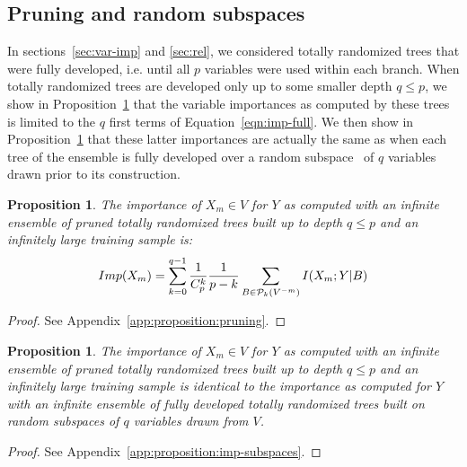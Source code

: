 \documentclass{article}
\newtheorem{proposition}[theorem]{Proposition}
\begin{document}

\subsection{Pruning and random subspaces}

In sections~\ref{sec:var-imp} and \ref{sec:rel}, we considered totally randomized trees that were
fully developed, i.e. until all $p$ variables were used within each branch. When
totally randomized trees are developed only up to some smaller depth $q \leq p$,
we show in Proposition~\ref{proposition:pruning} that the variable importances
as computed by these trees is limited to the $q$ first terms of
Equation~\ref{eqn:imp-full}. We then show in Proposition~\ref{proposition:imp-subspaces}
that these latter importances are actually the same as when each tree
of the ensemble is fully developed over a random subspace~\citep{ho1998random}
of $q$ variables drawn prior to its construction.

\begin{proposition}\label{proposition:pruning}
  The importance of $X_m \in V$ for $Y$ as computed with an
  infinite ensemble of pruned totally randomized trees built up to depth $q \leq p$ and an
infinitely large training sample is:
  \begin{equation}\label{eqn:imp-pruning}
  Imp(X_m)=\sum_{k=0}^{q-1} \frac{1}{C_p^k} \frac{1}{p-k} \sum_{B \in {\cal P}_k(V^{-m})} I(X_m;Y|B)
  \end{equation}
\end{proposition}

\begin{proof}
See Appendix~\ref{app:proposition:pruning}.
\end{proof}

\begin{proposition}\label{proposition:imp-subspaces}
  The importance of $X_m \in V$ for $Y$ as computed with an infinite ensemble   of
pruned totally randomized trees built up to depth $q \leq p$ and an infinitely
large training sample is identical to the importance as computed  for $Y$ with an
infinite ensemble of fully developed totally randomized trees built on random
subspaces of $q$ variables drawn from $V$.
\end{proposition}

\begin{proof}
See Appendix~\ref{app:proposition:imp-subspaces}.
\end{proof}
\end{document}
